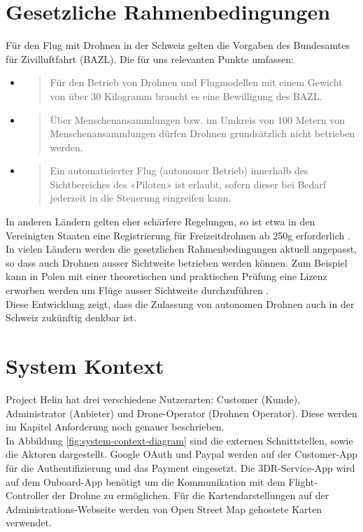 \section{Gesetzliche Rahmenbedingungen}
Für den Flug mit Drohnen in der Schweiz gelten die Vorgaben des Bundesamtes für Zivilluftfahrt (BAZL). Die für uns relevanten Punkte umfassen:
\begin{itemize}
	\item{\blockquote{Für den Betrieb von Drohnen und Flugmodellen mit einem Gewicht von über 30 Kilogramm braucht es eine Bewilligung des BAZL.} \cite{drohne-bazl}}
	\item{\blockquote{Über Menschenansammlungen bzw. im Umkreis von 100 Metern von Menschenansammlungen dürfen Drohnen grundsätzlich nicht betrieben werden.} \cite{drohne-bazl}}
	\item{\blockquote{Ein automatisierter Flug (autonomer Betrieb) innerhalb des Sichtbereiches des «Piloten» ist erlaubt, sofern dieser bei Bedarf jederzeit in die Steuerung eingreifen kann.}
	\cite{drohne-bazl}}
\end{itemize}
In anderen Ländern gelten eher schärfere Regelungen, so ist etwa in den Vereinigten Staaten eine Registrierung für Freizeitdrohnen ab 250g erforderlich \cite[]{pwc-drone}. In vielen Ländern werden die gesetzlichen Rahmenbedingungen aktuell angepasst, so dass auch Drohnen ausser Sichtweite betrieben werden können. Zum Beispiel kann in Polen mit einer theoretischen und praktischen Prüfung eine Lizenz erworben werden um Flüge ausser Sichtweite durchzuführen \cite[]{pwc-drone}.\\

Diese Entwicklung zeigt, dass die Zulassung von autonomen Drohnen auch in der Schweiz zukünftig denkbar ist. 

\section{System Kontext}

Project Helin hat drei verschiedene Nutzerarten: Customer (Kunde), Administrator (Anbieter) und Drone-Operator (Drohnen Operator). Diese werden im Kapitel Anforderung noch genauer beschrieben.\\

In Abbildung \ref{fig:system-context-diagram} sind die externen Schnittstellen, sowie die Aktoren dargestellt. Google OAuth und Paypal werden auf der Customer-App für die Authentifizierung und das Payment eingesetzt. Die 3DR-Service-App wird auf dem Onboard-App benötigt um die Kommunikation mit dem Flight-Controller der Drohne zu ermöglichen. Für die Kartendarstellungen auf der Administrations-Webseite werden von Open Street Map gehostete Karten verwendet.


